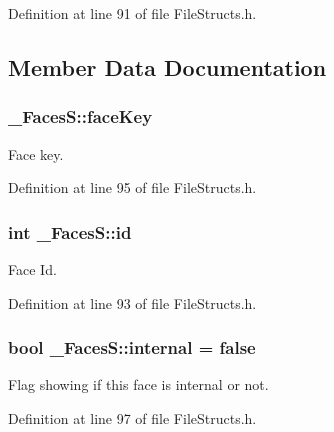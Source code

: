 Definition at line 91 of file File\+Structs.\+h.



\subsection{Member Data Documentation}
\subsubsection[{\texorpdfstring{face\+Key}{faceKey}}]{ \+\_\+\+Faces\+S\+::face\+Key}\hypertarget{struct___faces_s_a0b72e5930902a49f376d035d654ecef8}{}\label{struct___faces_s_a0b72e5930902a49f376d035d654ecef8}


Face key. 



Definition at line 95 of file File\+Structs.\+h.

\subsubsection[{\texorpdfstring{id}{id}}]{\setlength{\rightskip}{0pt plus 5cm}int \+\_\+\+Faces\+S\+::id}\hypertarget{struct___faces_s_a7365ff5c5951b2a61ef5e4411b0d521a}{}\label{struct___faces_s_a7365ff5c5951b2a61ef5e4411b0d521a}


Face Id. 



Definition at line 93 of file File\+Structs.\+h.

\subsubsection[{\texorpdfstring{internal}{internal}}]{\setlength{\rightskip}{0pt plus 5cm}bool \+\_\+\+Faces\+S\+::internal = false}\hypertarget{struct___faces_s_a5ce239e336aea528dad6008a6f2909f0}{}\label{struct___faces_s_a5ce239e336aea528dad6008a6f2909f0}


Flag showing if this face is internal or not. 



Definition at line 97 of file File\+Structs.\+h.

